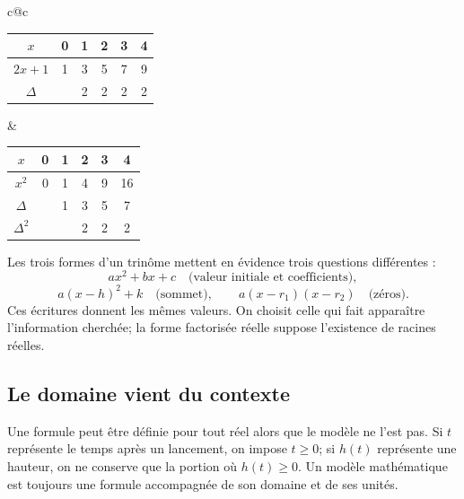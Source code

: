 \begin{center}
\begin{tabular}{c@{\hspace{1.4cm}}c}
\begin{tabular}{c|ccccc}
$x$&0&1&2&3&4\\\hline
$2x+1$&1&3&5&7&9\\
$\Delta$&&2&2&2&2
\end{tabular}
&
\begin{tabular}{c|ccccc}
$x$&0&1&2&3&4\\\hline
$x^2$&0&1&4&9&16\\
$\Delta$&&1&3&5&7\\
$\Delta^2$&&&2&2&2
\end{tabular}
\end{tabular}
\end{center}

\begin{center}
\qquad
{}
\end{center}

\begin{connectionbox}
Les trois formes d'un trinôme mettent en évidence trois questions différentes :
\[
ax^2+bx+c \quad\text{(valeur initiale et coefficients)},
\]
\[
a(x-h)^2+k \quad\text{(sommet)},
\qquad
 a(x-r_1)(x-r_2) \quad\text{(zéros)}.
\]
Ces écritures donnent les mêmes valeurs. On choisit celle qui fait apparaître l'information cherchée; la forme factorisée réelle suppose l'existence de racines réelles.
\end{connectionbox}

\subsection{Le domaine vient du contexte}
Une formule peut être définie pour tout réel alors que le modèle ne l'est pas. Si $t$ représente le temps après un lancement, on impose $t\ge0$; si $h(t)$ représente une hauteur, on ne conserve que la portion où $h(t)\ge0$. Un modèle mathématique est toujours une formule accompagnée de son domaine et de ses unités.


